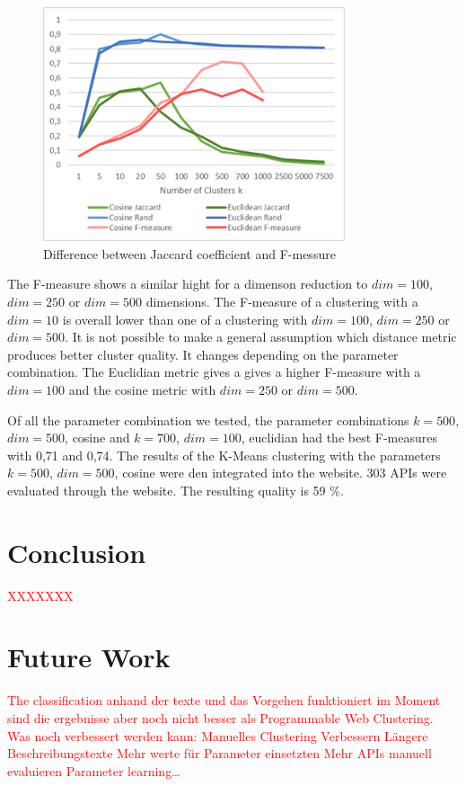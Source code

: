 \documentclass[a4paper]{IEEEtran}
\begin{document}
\begin{figure}[!t]
\centering
\includegraphics[width= 3.5in]{img/Jaccard.png}
\caption{Difference between Jaccard coefficient and F-messure}
\label{fig_sim}
\end{figure}

The F-measure shows a similar hight for a dimenson reduction to $dim⁡= 100$, $dim⁡= 250$ or $dim⁡= 500$ dimensions. The F-measure of a clustering with a $dim=10$ is overall lower than one of a clustering with $dim⁡= 100$, $dim⁡= 250$ or $dim⁡= 500$. 
It is not possible to make a general assumption which distance metric produces better cluster quality. It changes depending on the parameter combination. The Euclidian metric gives a gives a higher F-measure with a $dim⁡= 100$ and the cosine metric with $dim⁡= 250$ or $dim⁡= 500$.

Of all the parameter combination we tested, the parameter combinations $k⁡= 500$, $dim⁡= 500$, cosine and $k⁡= 700$, $dim⁡= 100$, euclidian had the best F-measures with 0,71 and 0,74.
The results of the K-Means clustering with the parameters $k⁡= 500$, $dim⁡= 500$, cosine were den integrated into the website. 303 APIs were evaluated through the website. The resulting quality is 59 \%.

\section{Conclusion}
\textcolor{red} {XXXXXXX}

\section{Future Work}
\textcolor{red} {The classification anhand der texte und das Vorgehen funktioniert im Moment sind die ergebnisse aber noch nicht besser als Programmable Web Clustering. Was noch verbessert werden kann: 
Manuelles Clustering Verbessern
Längere Beschreibungstexte
Mehr werte für Parameter einsetzten
Mehr APIs manuell evaluieren
Parameter learning… }




\end{document}
